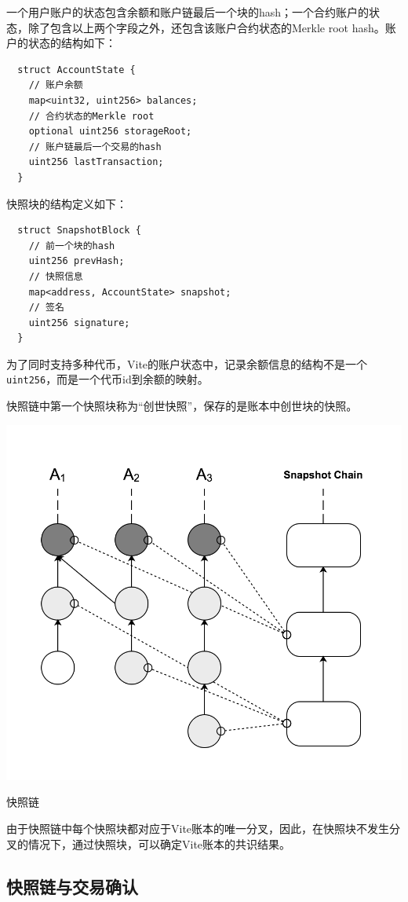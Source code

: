 \documentclass[UTF8,nofonts]{ctexart}
\makeatletter
\newenvironment{figurehere}
 {\def\@captype{figure}}
 {}
\makeatother
\begin{document}
\begin{multicols}{2}
一个用户账户的状态包含余额和账户链最后一个块的hash；一个合约账户的状态，除了包含以上两个字段之外，还包含该账户合约状态的Merkle root hash。账户的状态的结构如下：

\begin{verbatim}
  struct AccountState {
    // 账户余额
    map<uint32, uint256> balances;
    // 合约状态的Merkle root
    optional uint256 storageRoot;
    // 账户链最后一个交易的hash
    uint256 lastTransaction;
  }
\end{verbatim}

快照块的结构定义如下：
\begin{verbatim}
  struct SnapshotBlock {
    // 前一个块的hash    
    uint256 prevHash;
    // 快照信息
    map<address, AccountState> snapshot;
    // 签名
    uint256 signature;
  }
\end{verbatim}

为了同时支持多种代币，Vite的账户状态中，记录余额信息的结构不是一个\texttt{uint256}，而是一个代币id到余额的映射。

快照链中第一个快照块称为“创世快照”，保存的是账本中创世块的快照。

\begin{center}
\begin{figurehere}
\includegraphics[width=.7\linewidth]{image/snapshotchain.png}
\caption{快照链}
\end{figurehere}
\end{center}

由于快照链中每个快照块都对应于Vite账本的唯一分叉，因此，在快照块不发生分叉的情况下，通过快照块，可以确定Vite账本的共识结果。

\subsection{快照链与交易确认}


\end{multicols}
\end{document}
